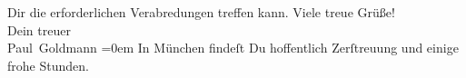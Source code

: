\begin{ledgroupsized}[t]{13cm}
               Dir die erforderlichen Verabredungen treffen kann.\pend
           \pstart
           Viele treue Grüße! {\\[\baselineskip]}Dein treuer {\\[\baselineskip]}\spacefill\mbox{Paul Goldmann}\pend
           \leftskip=0em{}\pstart
           \noindent{}In München findeſt Du hoffentlich
                  Zerſtreuung und einige frohe Stunden.\pend
           
         
         \endnumbering{}\end{ledgroupsized}  \newcommand{\dateiname}{L02886}\newcommand{\titel}{Paul Goldmann an Arthur Schnitzler, 12. 9. [1899]}\newcommand{\editorInnen}{Martin Anton Müller und Laura Untner}
      
